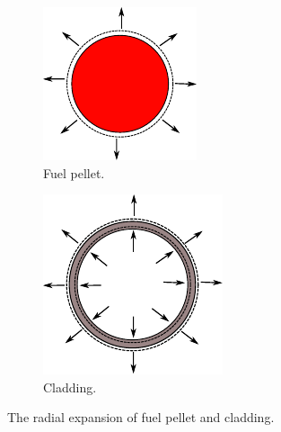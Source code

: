 \begin{figure}
    \centering
    \begin{subfigure}[b]{0.25\textwidth}
        \centering
        \includegraphics[width=\textwidth]{figs/pellet_exp.pdf}
        \caption{Fuel pellet.}
    \end{subfigure}
    \hspace{6em}
    \begin{subfigure}[b]{0.25\textwidth}
        \centering
        \includegraphics[width=\textwidth]{figs/clad_exp.pdf}
        \caption{Cladding.}
    \end{subfigure}
    \caption{The radial expansion of fuel pellet and cladding.}
       \label{fig_31}
\end{figure}

